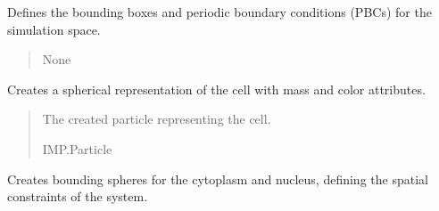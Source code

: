 \documentclass[letterpaper,10pt,english]{sphinxmanual}
\begin{document}
\begin{fulllineitems}
\begin{fulllineitems}
\label{\detokenize{src:src.System_Class.System.create_bounding_box_and_pbc}}
\pysigstartsignatures
{}
\pysigstopsignatures
\sphinxAtStartPar
Defines the bounding boxes and periodic boundary conditions (PBCs) for the simulation space.
\begin{quote}\begin{description}
\sphinxAtStartPar
{}

\sphinxAtStartPar
None

\end{description}\end{quote}

\end{fulllineitems}


\begin{fulllineitems}
\label{\detokenize{src:src.System_Class.System.create_cell}}
\pysigstartsignatures
{}
\pysigstopsignatures
\sphinxAtStartPar
Creates a spherical representation of the cell with mass and color attributes.
\begin{quote}\begin{description}
\sphinxAtStartPar
{}

\sphinxAtStartPar
The created particle representing the cell.

\sphinxAtStartPar
IMP.Particle

\end{description}\end{quote}

\end{fulllineitems}


\begin{fulllineitems}
\label{\detokenize{src:src.System_Class.System.create_cell_and_nucleus_bounding_sphere}}
\pysigstartsignatures
{}
\pysigstopsignatures
\sphinxAtStartPar
Creates bounding spheres for the cytoplasm and nucleus, defining the spatial constraints of the system.
\begin{quote}\begin{description}
\sphinxAtStartPar
{}


\end{description}
\end{quote}
\end{fulllineitems}
\end{fulllineitems}
\end{document}
